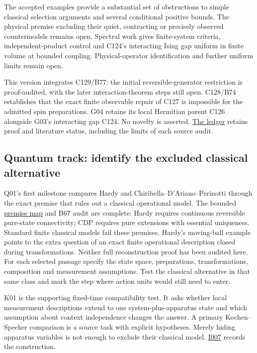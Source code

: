 \documentclass[11pt,a4paper]{article}
\begin{document}
The accepted examples provide a substantial set of obstructions to
simple classical selection arguments and several conditional positive
bounds. The physical premise excluding their quiet, contracting or
precisely observed countermodels remains open. Spectral work gives
finite-system criteria, independent-product control and C124's
interacting Ising gap uniform in finite volume at bounded coupling.
Physical-operator identification and further uniform limits remain open.

This version integrates C129/B77: the initial reversible-generator
restriction is proof-audited, with the later interaction-theorem steps
still open. C128/B74 establishes that the exact finite observable repair
of C127 is impossible for the admitted spin preparations. G04 retains
its local Hermitian parent C126 alongside G03's interacting gap C124. No
novelty is asserted. \href{../claims/LEDGER.md}{The ledger} retains
proof and literature status, including the limits of each source audit.

\hypertarget{quantum-track-identify-the-excluded-classical-alternative}{%
\subsection{Quantum track: identify the excluded classical
alternative}\label{quantum-track-identify-the-excluded-classical-alternative}}

Q01's first milestone compares Hardy and Chiribella--D'Ariano--Perinotti
through the exact premise that rules out a classical operational model.
The bounded \href{../notes/classical-orientation-closure.md#what-reconstruction-premises-add}{premise map}
and B67 audit are complete: Hardy requires continuous reversible
pure-state connectivity; CDP requires pure extensions with essential
uniqueness. Standard finite classical models fail these premises.
Hardy's moving-ball example points to the extra question of an exact
finite operational description closed during transformations. Neither
full reconstruction proof has been audited here. For each selected
passage specify the state space, preparations, transformations,
composition and measurement assumptions. Test the classical alternative
in that same class and mark the step where action units would still need
to enter.

K01 is the supporting fixed-time compatibility test. It asks whether
local measurement descriptions extend to one system-plus-apparatus state
and which assumption about context independence changes the answer. A
primary Kochen--Specker comparison is a source task with explicit
hypotheses. Merely hiding apparatus variables is not enough to exclude
their classical model.
\href{../ideas/I007-static-compatibility.md}{I007} records the
construction.
\end{document}
